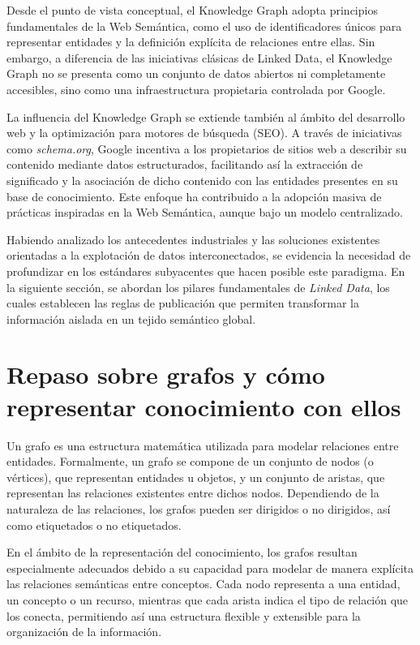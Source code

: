 \documentclass{article}
\begin{document}
Desde el punto de vista conceptual, el Knowledge Graph adopta principios fundamentales de la Web Semántica, como el uso de identificadores únicos para representar entidades y la definición explícita de relaciones entre ellas. Sin embargo, a diferencia de las iniciativas clásicas de Linked Data, el Knowledge Graph no se presenta como un conjunto de datos abiertos ni completamente accesibles, sino como una infraestructura propietaria controlada por Google.

La influencia del Knowledge Graph se extiende también al ámbito del desarrollo web y la optimización para motores de búsqueda (SEO). A través de iniciativas como \textit{schema.org}, Google incentiva a los propietarios de sitios web a describir su contenido mediante datos estructurados, facilitando así la extracción de significado y la asociación de dicho contenido con las entidades presentes en su base de conocimiento. Este enfoque ha contribuido a la adopción masiva de prácticas inspiradas en la Web Semántica, aunque bajo un modelo centralizado.

Habiendo analizado los antecedentes industriales y las soluciones existentes orientadas a la explotación de datos interconectados, se evidencia la necesidad de profundizar en los estándares subyacentes que hacen posible este paradigma. En la siguiente sección, se abordan los pilares fundamentales de \textit{Linked Data}, los cuales establecen las reglas de publicación que permiten transformar la información aislada en un tejido semántico global.

\section{Repaso sobre grafos y cómo representar conocimiento con ellos}
Un grafo es una estructura matemática utilizada para modelar relaciones entre entidades. Formalmente, un grafo se compone de un conjunto de nodos (o vértices), que representan entidades u objetos, y un conjunto de aristas, que representan las relaciones existentes entre dichos nodos. Dependiendo de la naturaleza de las relaciones, los grafos pueden ser dirigidos o no dirigidos, así como etiquetados o no etiquetados.

En el ámbito de la representación del conocimiento, los grafos resultan especialmente adecuados debido a su capacidad para modelar de manera explícita las relaciones semánticas entre conceptos. Cada nodo representa  a una entidad, un concepto o un recurso, mientras que cada arista indica el tipo de relación que los conecta, permitiendo así una estructura flexible y extensible para la organización de la información.
\end{document}
